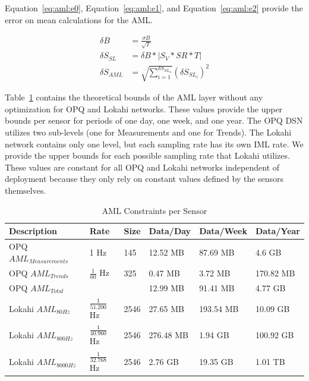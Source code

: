 Equation~\ref{eq:aml:e0}, Equation~\ref{eq:aml:e1}, and Equation~\ref{eq:aml:e2} provide the error on mean calculations for the AML\@.

\begin{align}
	\delta B &= \frac{\sigma B}{\sqrt{T}} \label{eq:aml:e0} \\
	\delta S_{SL} &= \delta B * |S_{V} * SR * T| \label{eq:aml:e1} \\
	\delta S_{AML} &= \sqrt{\sum_{i=1}^{\delta S_{SL_{n}}}} (\delta S_{SL_{i}}) ^ 2  \label{eq:aml:e2}
\end{align}

Table~\ref{table:aml_size} contains the theoretical bounds of the AML layer without any optimization for OPQ and Lokahi networks. These values provide the upper bounds per sensor for periods of one day, one week, and one year. The OPQ DSN utilizes two sub-levels (one for Measurements and one for Trends). The Lokahi network contains only one level, but each sampling rate has its own IML rate. We provide the upper bounds for each possible sampling rate that Lokahi utilizes. These values are constant for all OPQ and Lokahi networks independent of deployment because they only rely on constant values defined by the sensors themselves.

\begin{table}[H]
	\centering
	\caption{AML Constraints per Sensor}
	\begin{tabularx}{\textwidth}{Xlllll}
		\toprule
		\textbf{Description} & \textbf{Rate} & \textbf{Size} & \textbf{Data/Day} & \textbf{Data/Week} & \textbf{Data/Year} \\
		\midrule
		OPQ $AML_{Measurements}$ 	& 1 Hz 					& 145 			& 12.52 MB 	& 87.69 MB 	& 4.6 GB 	\\
		OPQ $AML_{Trends}$ 			& $\frac{1}{60}$ Hz 	& 325 			& 0.47 MB 	& 3.72 MB  	& 170.82 MB \\
		OPQ $AML_{Total}$ 			&   					&   			& 12.99 MB 	& 91.41 MB 	& 4.77 GB 	\\
		Lokahi $AML_{80Hz}$			& $\frac{1}{51.200}$ Hz	& 2546  		& 27.65 MB 	& 193.54 MB & 10.09 GB	\\
		Lokahi $AML_{800Hz}$		& $\frac{1}{40.960}$ Hz	& 2546		& 276.48 MB & 1.94 GB 	& 100.92 GB \\
		Lokahi $AML_{8000Hz}$		& $\frac{1}{32.768}$ Hz	& 2546		& 2.76 GB 	& 19.35 GB 	& 1.01 TB 	\\
		\bottomrule
	\end{tabularx}
	\label{table:aml_size}
\end{table}

